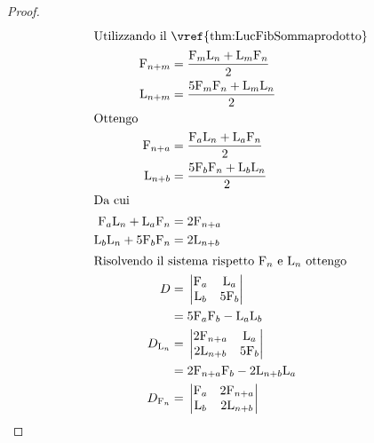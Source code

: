 \begin{proof}
	\begin{align*}
		\intertext{Utilizzando il~\vref{thm:LucFibSommaprodotto}}
		\Fib{n+m}={}                      & \dfrac{\Fib{m}\Luc{n}+\Luc{m}\Fib{n}}{2}                                                \\
		\Luc{n+m}={}                      & \dfrac{5\Fib{m}\Fib{n}+\Luc{m}\Luc{n}}{2}                                               \\
		\intertext{Ottengo}
		\Fib{n+a}={}                      & \dfrac{\Fib{a}\Luc{n}+\Luc{a}\Fib{n}}{2}                                                \\
		\Luc{n+b}={}                      & \dfrac{5\Fib{b}\Fib{n}+\Luc{b}\Luc{n}}{2}                                               \\
		\intertext{Da cui}
		\Fib{a}\Luc{n}+\Luc{a}\Fib{n}={}  & 2\Fib{n+a}                                                                              \\
		\Luc{b}\Luc{n}+5\Fib{b}\Fib{n}={} & 2\Luc{n+b}                                                                              \\
		\intertext{Risolvendo il sistema rispetto $\Fib{n}$ e $\Luc{n}$ ottengo}
		D ={}                             & \begin{vmatrix}
			                                    \Fib{a} & \Luc{a}  \\
			                                    \Luc{b} & 5\Fib{b}
		                                    \end{vmatrix}                                                                      \\ ={}& 5\Fib{a}\Fib{b}-\Luc{a}\Luc{b}\\
		D_{\Luc{n}} ={}                   & \begin{vmatrix}
			                                    2\Fib{n+a} & \Luc{a}  \\
			                                    2\Luc{n+b} & 5\Fib{b}
		                                    \end{vmatrix}                                                                   \\ ={}& 2\Fib{n+a}\Fib{b}-2\Luc{n+b}\Luc{a}\\
		D_{\Fib{n}} ={}                   & \begin{vmatrix}
			                                    \Fib{a} & 2\Fib{n+a} \\
			                                    \Luc{b} & 2\Luc{n+b}

\end{vmatrix}
\end{align*}
\end{proof}
